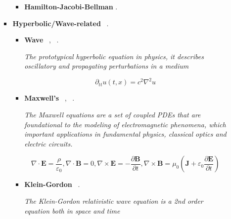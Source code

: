 \documentclass[12pt,letterpaper]{article}
\begin{document}
\begin{itemize}
\begin{itemize}
\begin{itemize}
\begin{itemize}
                        \item \textbf{Hamilton-Jacobi-Bellman}  \cite{patelQuantumInspiredTensorNeural2022}.
                    \end{itemize} 

                    
     
                    \item \textbf{Hyperbolic/Wave-related}  ~\cite{jinTimeComplexityAnalysis2022a,jinQuantumAlgorithmsComputing2022}.
                         \begin{itemize} 
                             \item \textbf{Wave}  ~\cite{costaQuantumAlgorithmSimulating2019,suauPracticalQuantumComputing2021},  ~\cite{criadoQadeSolvingDifferential2022}.

                             \textit{The prototypical hyperbolic equation in physics, it describes oscillatory and propagating perturbations in a medium}

                             $$ \partial_{tt} u(t,x) = c^2 \nabla^2 u$$
                         
                            \item \textbf{Maxwell's}  ~\cite{costaQuantumAlgorithmSimulating2019}, ~\cite{novikauQuantumSignalProcessing2022,novikauSimulationLinearNonHermitian2022}.
                            
                            \textit{The Maxwell equations are a set of coupled PDEs that are foundational to the modeling of electromagnetic phenomena, which important applications in fundamental physics, classical optics and electric circuits.}
                            
                            $$\nabla \cdot \mathbf{E}=\frac{\rho}{\varepsilon_0}, \nabla \cdot \mathbf{B}=0, \nabla \times \mathbf{E}=-\frac{\partial \mathbf{B}}{\partial t}, \nabla \times \mathbf{B}=\mu_0\left(\mathbf{J}+\varepsilon_0 \frac{\partial \mathbf{E}}{\partial t}\right)$$

                           \item \textbf{Klein-Gordon}  ~\cite{costaQuantumAlgorithmSimulating2019}.

                            \textit{The Klein-Gordon relativistic wave equation is a 2nd order equation both in space and time}


\end{itemize}
\end{itemize}
\end{itemize}
\end{itemize}
\end{document}
